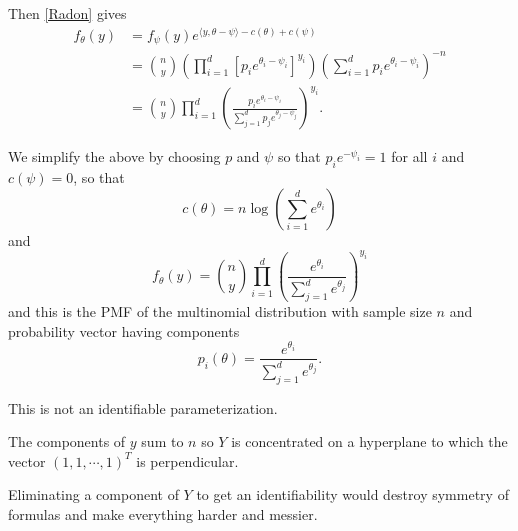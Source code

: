 \documentclass[
  ignorenonframetext,
]{beamer}
\begin{document}
\begin{frame}{}
\protect\hypertarget{section-7}{}
Then \eqref{Radon} gives \begin{align*}
  f_{\theta}(y) &= f_{\psi}(y)e^{\langle y,\theta-\psi\rangle - c(\theta) + c(\psi)} \\
    &= {n \choose y} \left(\prod_{i=1}^d\left[p_ie^{\theta_i-\psi_i}\right]^{y_i}\right)\left(\sum_{i=1}^d p_ie^{\theta_i-\psi_i}\right)^{-n} \\
    &= {n \choose y} \prod_{i=1}^d \left(\frac{p_ie^{\theta_i-\psi_i}}{\sum_{j=1}^dp_je^{\theta_j-\psi_j}}\right)^{y_i}.
\end{align*}
\end{frame}

\begin{frame}{}
\protect\hypertarget{section-8}{}
We simplify the above by choosing \(p\) and \(\psi\) so that
\(p_ie^{-\psi_i} = 1\) for all \(i\) and \(c(\psi) = 0\), so that \[
  c(\theta) = n\log\left(\sum_{i=1}^d e^{\theta_i}\right)
\] and \[
  f_{\theta}(y) = {n \choose y}\prod_{i=1}^d \left(\frac{e^{\theta_i}}{\sum_{j=1}^d e^{\theta_j}}\right)^{y_i}
\] and this is the PMF of the multinomial distribution with sample size
\(n\) and probability vector having components \[
  p_i(\theta) = \frac{e^{\theta_i}}{\sum_{j=1}^d e^{\theta_j}}.
\]
\end{frame}

\begin{frame}{}
\protect\hypertarget{section-9}{}
This is not an identifiable parameterization.

The components of \(y\) sum to \(n\) so \(Y\) is concentrated on a
hyperplane to which the vector \((1,1, \cdots, 1)^T\) is perpendicular.

Eliminating a component of \(Y\) to get an identifiability would destroy
symmetry of formulas and make everything harder and messier.
\end{frame}
\end{document}
